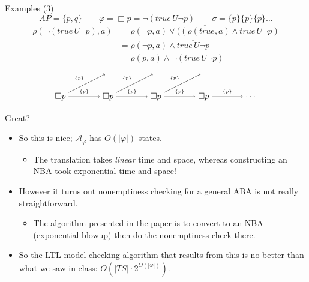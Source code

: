 \documentclass{beamer}
\begin{document}
\begin{frame}{Examples (3)}
$$AP = \{p, q\} \qquad \varphi = \Box p = \neg (true \, U \neg p) \qquad \sigma = \{p\} \{p\} \{p\} \dots$$
\begin{align*}
\rho(\neg (true \, U \neg p), a) &= \overline{\rho(\neg p, a) \vee ((\rho(true, a) \wedge true \, U \neg p)} \\
&= \overline{\rho(\neg p, a)} \wedge \overline{true \, U \neg p} \\
&= \rho(p, a) \wedge \neg (true \, U \neg p)
\end{align*}
$$
\begin{tikzpicture}[node distance=5em, auto]
\node (1) at (0, 0) {$\Box p$};
\node (2a) at (2, 1) {};
\node (2) at (2, 0) {$\Box p$};
\node (3a) at (4, 1) {};
\node (3) at (4, 0) {$\Box p$};
\node (5a) at (6, 1) {};
\node (4) at (6, 0) {$\Box p$};
\node (5) at (8, 0) {$\dots$};
\path[->] (1) edge node {{\tiny $\{p\}$}} (2a)
          (1) edge node {{\tiny $\{p\}$}} (2)
          (2) edge node {{\tiny $\{p\}$}} (3a)
          (2) edge node {{\tiny $\{p\}$}} (3)
          (3) edge node {{\tiny $\{p\}$}} (5a)
          (3) edge node {{\tiny $\{p\}$}} (4)
          (4) edge node {{\tiny $\{p\}$}} (5);
\end{tikzpicture}
$$                                          
\end{frame}

\begin{frame}{Great?}
\begin{itemize}
\item So this is nice; $\mathcal{A}_\varphi$ has $O(|\varphi|)$ states.
    \begin{itemize}
    \item The translation takes \emph{linear} time and space, whereas 
          constructing an NBA took exponential time and space!
    \end{itemize}
\pause
\item However it turns out nonemptiness checking for a general ABA is not
really straightforward.
    \begin{itemize}
    \item The algorithm presented in the paper is to convert to an NBA
          (exponential blowup) then do the nonemptiness check there.
    \end{itemize}
\pause
\item So the LTL model checking algorithm that results from this is no
better than what we saw in class: $O(|TS| \cdot 2^{O(|\varphi|)})$.
\end{itemize}
\end{frame}
\end{document}
